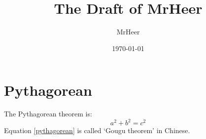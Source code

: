 \documentclass[12pt]{article}
\title{The Draft of MrHeer}
\author{MrHeer}
\date{\today}
\numberwithin{equation}{section}
\begin{document}
\begin{titlepage}
    \maketitle
    \thispagestyle{empty}
\end{titlepage}

\begin{center}
    \tableofcontents
\end{center}

\newpage
{}
\setcounter{page}{1}
\section{Pythagorean}
The Pythagorean theorem is:
\begin{equation}
    a^2 + b^2 = c^2 \label{pythagorean}
\end{equation}
Equation \eqref{pythagorean} is called ‘Gougu theorem’ in Chinese.
\end{document}
